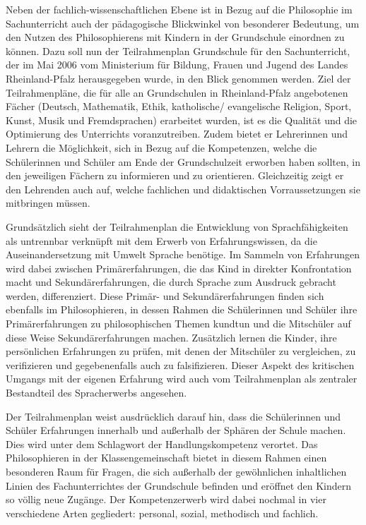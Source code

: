 Neben der fachlich-wissenschaftlichen Ebene ist in Bezug auf die Philosophie im Sachunterricht auch der pädagogische Blickwinkel von besonderer Bedeutung, um den Nutzen des Philosophierens mit Kindern in der Grundschule einordnen zu können. 
Dazu soll nun der Teilrahmenplan Grundschule für den Sachunterricht, der im Mai 2006 vom Ministerium für Bildung, Frauen und Jugend des Landes Rheinland-Pfalz herausgegeben wurde, in den Blick genommen werden. 
Ziel der Teilrahmenpläne, die für alle an Grundschulen in Rheinland-Pfalz angebotenen Fächer (Deutsch, Mathematik, Ethik, katholische/ evangelische Religion, Sport, Kunst, Musik und Fremdsprachen) erarbeitet wurden, ist es die Qualität und die Optimierung des Unterrichts voranzutreiben. 
Zudem bietet er Lehrerinnen und Lehrern die Möglichkeit, sich in Bezug auf die Kompetenzen, welche die Schülerinnen und Schüler am Ende der Grundschulzeit erworben haben sollten, in den jeweiligen Fächern zu informieren und zu orientieren. 
Gleichzeitig zeigt er den Lehrenden auch auf, welche fachlichen und didaktischen Vorraussetzungen sie mitbringen müssen.

Grundsätzlich sieht der Teilrahmenplan die Entwicklung von Sprachfähigkeiten als untrennbar verknüpft mit dem Erwerb von Erfahrungswissen, da die Auseinandersetzung mit Umwelt Sprache benötige\cite{MDFJ06, S.6}.
Im Sammeln von Erfahrungen wird dabei zwischen Primärerfahrungen, die das Kind in direkter Konfrontation macht und Sekundärerfahrungen, die durch Sprache zum Ausdruck gebracht werden, differenziert. 
Diese Primär- und Sekundärerfahrungen finden sich ebenfalls im Philosophieren, in dessen Rahmen die Schülerinnen und Schüler ihre Primärerfahrungen zu philosophischen Themen kundtun und die Mitschüler auf diese Weise Sekundärerfahrungen machen. 
Zusätzlich lernen die Kinder, ihre persönlichen Erfahrungen zu prüfen, mit denen der Mitschüler zu vergleichen, zu verifizieren und gegebenenfalls auch zu falsifizieren. 
Dieser Aspekt des kritischen Umgangs mit der eigenen Erfahrung wird auch vom Teilrahmenplan als zentraler Bestandteil des Spracherwerbs angesehen.

Der Teilrahmenplan weist ausdrücklich darauf hin, dass die Schülerinnen und Schüler Erfahrungen innerhalb und außerhalb der Sphären der Schule machen. 
Dies wird unter dem Schlagwort der \glqq Handlungskompetenz\grqq{} verortet. 
Das Philosophieren in der Klassengemeinschaft bietet in diesem Rahmen einen besonderen Raum für Fragen, die sich außerhalb der gewöhnlichen inhaltlichen Linien des Fachunterrichtes der Grundschule befinden und eröffnet den Kindern so völlig neue Zugänge. 
Der Kompetenzerwerb wird dabei nochmal in vier verschiedene Arten gegliedert: personal, sozial, methodisch und fachlich. 

